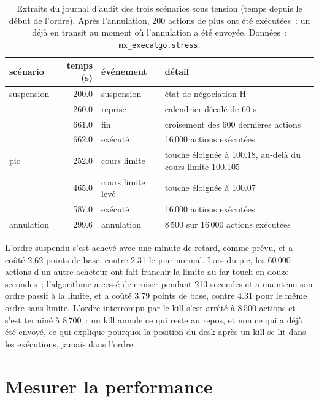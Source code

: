 \begin{table}[ht]
\centering
\small
\begin{tabular}{@{}lrll@{}}
\toprule
scénario & temps (s) & événement & détail \\
\midrule
suspension & 200.0 & suspension & état de négociation H \\
 & 260.0 & reprise & calendrier décalé de 60 s \\
 & 661.0 & fin & croisement des 600 dernières actions \\
 & 662.0 & exécuté & 16\,000 actions exécutées \\
pic & 252.0 & cours limite & touche éloignée à 100.18, au-delà du cours limite 100.105 \\
 & 465.0 & cours limite levé & touche éloignée à 100.07 \\
 & 587.0 & exécuté & 16\,000 actions exécutées \\
annulation & 299.6 & annulation & 8\,500 sur 16\,000 actions exécutées \\
\bottomrule
\end{tabular}
\caption{Extraits du journal d'audit des trois scénarios sous tension (temps depuis le début de l'ordre). Après l'annulation, 200 actions de plus ont été exécutées~: un 
déjà en transit au moment où l'annulation a été envoyée. Données~: \texttt{mx\_execalgo.stress}.}\label{tab:mx:build-an-execution-algorithm:log}
\end{table}

L'ordre suspendu s'est achevé avec une minute de retard, comme prévu, et a coûté 2.62 points de base, contre 2.31 le jour normal. Lors du pic, les 60\,000
actions d'un autre acheteur ont fait franchir la limite au far touch en douze secondes~; l'algorithme a cessé de croiser pendant 213 secondes et a maintenu son ordre passif à la limite,
et a coûté 3.79 points de base, contre 4.31 pour le même ordre sans limite. L'ordre interrompu par le kill s'est arrêté à 8\,500 actions et s'est terminé à 8\,700~: un kill
annule ce qui reste au repos, et non ce qui a déjà été envoyé, ce qui explique pourquoi la position du desk après un kill se lit dans les exécutions, jamais dans l'ordre.

\section{Mesurer la performance}

